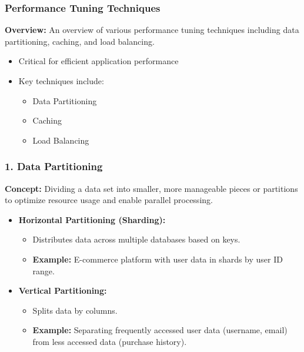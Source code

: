 \documentclass{beamer}
\begin{document}
\begin{frame}[fragile]
    \frametitle{Performance Tuning Techniques}
    \textbf{Overview:} An overview of various performance tuning techniques including data partitioning, caching, and load balancing.
    
    \begin{itemize}
        \item Critical for efficient application performance
        \item Key techniques include:
        \begin{itemize}
            \item Data Partitioning
            \item Caching
            \item Load Balancing
        \end{itemize}
    \end{itemize}
\end{frame}

\begin{frame}[fragile]
    \frametitle{1. Data Partitioning}
    \textbf{Concept:} Dividing a data set into smaller, more manageable pieces or partitions to optimize resource usage and enable parallel processing.

    \begin{itemize}
        \item \textbf{Horizontal Partitioning (Sharding):}
        \begin{itemize}
            \item Distributes data across multiple databases based on keys.
            \item \textbf{Example:} E-commerce platform with user data in shards by user ID range.
        \end{itemize}
        
        \item \textbf{Vertical Partitioning:}
        \begin{itemize}
            \item Splits data by columns.
            \item \textbf{Example:} Separating frequently accessed user data (username, email) from less accessed data (purchase history).
        \end{itemize}
    \end{itemize}
\end{frame}
\end{document}

